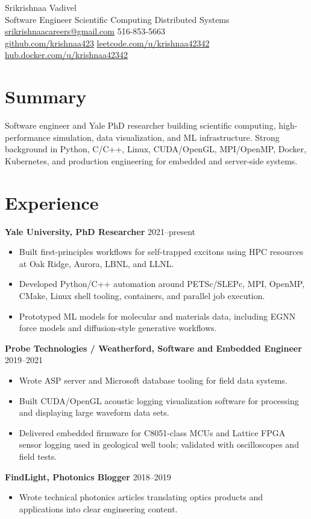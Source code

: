 \documentclass[10pt]{article}
\begin{document}
\begin{center}
{\LARGE Srikrishnaa Vadivel}\\
Software Engineer \textbar{} Scientific Computing \textbar{} Distributed Systems\\
\href{mailto:srikrishnaacareers@gmail.com}{srikrishnaacareers@gmail.com} \textbar{} 516-853-5663\\
\href{https://github.com/krishnaa423}{github.com/krishnaa423} \textbar{}
\href{https://leetcode.com/u/krishnaa42342/}{leetcode.com/u/krishnaa42342} \textbar{}
\href{https://hub.docker.com/u/krishnaa42342}{hub.docker.com/u/krishnaa42342}
\end{center}

\section{Summary}
Software engineer and Yale PhD researcher building scientific computing,
high-performance simulation, data visualization, and ML infrastructure. Strong
background in Python, C/C++, Linux, CUDA/OpenGL, MPI/OpenMP, Docker, Kubernetes,
and production engineering for embedded and server-side systems.

\section{Experience}
\textbf{Yale University, PhD Researcher} \hfill 2021--present\\
\begin{itemize}
\item Built first-principles workflows for self-trapped excitons using HPC
resources at Oak Ridge, Aurora, LBNL, and LLNL.
\item Developed Python/C++ automation around PETSc/SLEPc, MPI, OpenMP, CMake,
Linux shell tooling, containers, and parallel job execution.
\item Prototyped ML models for molecular and materials data, including EGNN
force models and diffusion-style generative workflows.
\end{itemize}
\textbf{Probe Technologies / Weatherford, Software and Embedded Engineer} \hfill 2019--2021\\
\begin{itemize}
\item Wrote ASP server and Microsoft database tooling for field data systems.
\item Built CUDA/OpenGL acoustic logging visualization software for processing
and displaying large waveform data sets.
\item Delivered embedded firmware for C8051-class MCUs and Lattice FPGA sensor
logging used in geological well tools; validated with oscilloscopes and field
tests.
\end{itemize}
\textbf{FindLight, Photonics Blogger} \hfill 2018--2019\\
\begin{itemize}
\item Wrote technical photonics articles translating optics products and
applications into clear engineering content.
\end{itemize}
\end{document}
